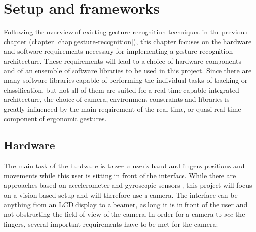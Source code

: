 \chapter{Setup and frameworks}
\label{chap:setup-and-frameworks}

Following the overview of existing gesture recognition techniques in the previous chapter (chapter \ref{chap:gesture-recognition}), this chapter focuses on the hardware and software requirements necessary for implementing a gesture recognition architecture. These requirements will lead to a choice of hardware components and of an ensemble of software libraries to be used in this project. Since there are many software libraries capable of performing the individual tasks of tracking or classification, but not all of them are suited for a real-time-capable integrated architecture, the choice of camera, environment constraints and libraries is greatly influenced by the main requirement of the real-time, or quasi-real-time component of ergonomic gestures.

\section{Hardware}
\label{sec:hardware}

The main task of the hardware is to see a user's hand and fingers positions and movements while this user is sitting in front of the interface. While there are approaches based on accelerometer and gyroscopic sensors 
\cite{dataglove}, this project will focus on a vision-based setup and will therefore use a camera. The interface can be anything from an LCD display to a beamer, as long it is in front of the user and not obstructing the field of view of the camera. In order for a camera to \textit{see} the fingers, several important requirements have to be met for the camera:

